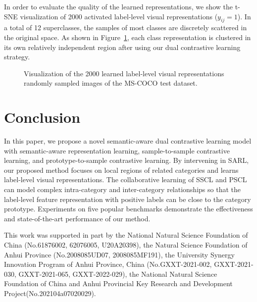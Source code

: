 \documentclass{ecai}
\begin{document}
In order to evaluate the quality of the learned representations, we show the t-SNE visualization of 2000 activated label-level visual representations ($y_{ij}\!=\!1$). In a total of 12 superclasses, the samples of most classes are discretely scattered in the original space. As shown in Figure~\ref{learned_features}, each class representation is clustered in its own relatively independent region after using our dual contrastive learning strategy.
\begin{figure}
\centering
	\subfigbottomskip=-5pt
	
	
	
	\caption{Visualization of the 2000 learned label-level visual representations randomly sampled images of the MS-COCO test dataset.}
\label{learned_features}
\end{figure}



\section{Conclusion}
In this paper, we propose a novel semantic-aware dual contrastive learning model with semantic-aware representation learning, sample-to-sample contrastive learning, and prototype-to-sample contrastive learning.
By intervening in SARL, our proposed method focuses on local regions of related categories and learns label-level visual representations.
The collaborative learning of SSCL and PSCL can model complex intra-category and inter-category relationships so that the label-level feature representation with positive labels can be close to the category prototype.
Experiments on five popular benchmarks demonstrate the effectiveness and state-of-the-art performance of our method.

\ack This work was supported in part by the National Natural Science Foundation of China (No.61876002, 62076005, U20A20398), 
the Natural Science Foundation of Anhui Province (No.2008085UD07, 2008085MF191), 
the University Synergy Innovation Program of Anhui Province, China (No.GXXT-2021-002, GXXT-2021-030, GXXT-2021-065, GXXT-2022-029), 
the National Natural Science Foundation of China and Anhui Provincial Key Research and Development Project(No.202104a07020029).






\end{document}

